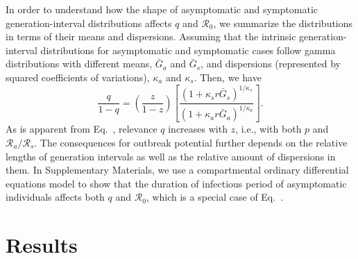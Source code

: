 In order to understand how the shape of asymptomatic and symptomatic generation-interval distributions affects $q$ and $\mathcal R_0$, we summarize the distributions in terms of their means and dispersions.
Assuming that the intrinsic generation-interval distributions for asymptomatic and symptomatic cases follow gamma distributions with different means, $\bar G_a$ and  $\bar G_s$, and dispersions (represented by squared coefficients of variations), $\kappa_a$ and $\kappa_s$.
Then, we have
\begin{equation}
\frac{q}{1-q}=\left(\frac{z}{1-z}\right)\left[\frac{(1 + \kappa_s r \bar G_s)^{1/\kappa_s}}{(1 + \kappa_a r \bar G_a)^{1/\kappa_a}}\right].
\label{eq.gammaratio}
\end{equation}
As is apparent from Eq.~, relevance $q$ increases with $z$, i.e., with both $p$ and $\mathcal R_a/\mathcal R_s$. The consequences for outbreak potential further depends on the relative lengths of generation intervals as well as the relative amount of dispersions in them.
In Supplementary Materials, we use a compartmental ordinary differential equations model to show that the duration of infectious period of asymptomatic individuals affects both $q$ and $\mathcal R_0$, which is a special case of Eq.~.

\section{Results}

